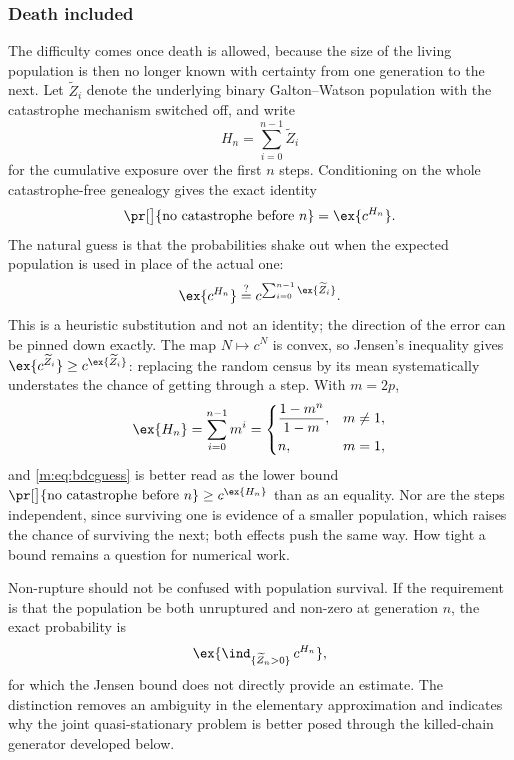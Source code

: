 \subsubsection*{Death included}

The difficulty comes once death is allowed, because the size of the living
population is then no longer known with certainty from one generation to the next.
Let $\widetilde Z_i$ denote the underlying binary Galton--Watson population with
the catastrophe mechanism switched off, and write
\begin{equation}
\label{m:eq:Hn}
H_n = \sum_{i=0}^{n-1}\widetilde Z_i
\end{equation}
for the cumulative exposure over the first $n$ steps. Conditioning on the whole
catastrophe-free genealogy gives the exact identity
\begin{equation}
\label{m:eq:noruptureexact}
\pr[\big]{\text{no catastrophe before }n}
= \ex{c^{H_n}} .
\end{equation}
The natural guess is that the probabilities shake out when the expected population
is used in place of the actual one:
\begin{equation}
\label{m:eq:bdcguess}
\ex{c^{H_n}} \overset{?}{=} c^{\sum_{i=0}^{n-1}\ex{\widetilde Z_i}} .
\end{equation}
This is a heuristic substitution and not an identity; the direction of the error
can be pinned down exactly. The map $N\mapsto c^N$ is convex, so Jensen's
inequality gives $\ex{c^{\widetilde Z_i}}\ge c^{\ex{\widetilde Z_i}}$: replacing
the random census by its mean systematically understates the chance of getting
through a step. With $m=2p$,
\begin{equation}
\label{m:eq:meanexposure}
\ex{H_n} = \sum_{i=0}^{n-1}m^i
= \begin{cases}
\dfrac{1-m^n}{1-m}, & m\neq1,\\[2mm]
n, & m=1,
\end{cases}
\end{equation}
and \cref{m:eq:bdcguess} is better read as the lower bound
$\pr[\big]{\text{no catastrophe before }n}\ge c^{\ex{H_n}}$ than as an equality.
Nor are the steps independent, since surviving one is evidence of a smaller
population, which raises the chance of surviving the next; both effects push the
same way. How tight a bound remains a question for numerical work.

Non-rupture should not be confused with population survival. If the requirement is
that the population be both unruptured and non-zero at generation $n$, the exact
probability is
\begin{equation}
\label{m:eq:jointsurvival}
\ex{\ind_{\{\widetilde Z_n>0\}}\,c^{H_n}},
\end{equation}
for which the Jensen bound does not directly provide an estimate. The distinction
removes an ambiguity in the elementary approximation and indicates why the joint
quasi-stationary problem is better posed through the killed-chain generator
developed below.


